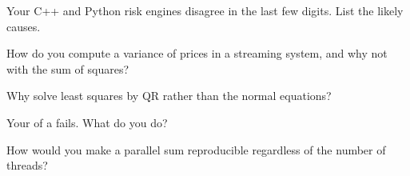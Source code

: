 \begin{interviewq}\label{iq:qm:floating-point-and-numerical-linear-algebra:2}
Your C++ and Python risk engines disagree in the last few digits. List the likely causes.
\end{interviewq}

\begin{interviewq}\label{iq:qm:floating-point-and-numerical-linear-algebra:3}
How do you compute a variance of prices in a streaming system, and why not with the sum of squares?
\end{interviewq}

\begin{interviewq}\label{iq:qm:floating-point-and-numerical-linear-algebra:4}
Why solve least squares by QR rather than the normal equations?
\end{interviewq}

\begin{interviewq}\label{iq:qm:floating-point-and-numerical-linear-algebra:5}
Your  of a  fails. What do you do?
\end{interviewq}

\begin{interviewq}\label{iq:qm:floating-point-and-numerical-linear-algebra:6}
How would you make a parallel sum reproducible regardless of the number of threads?
\end{interviewq}
